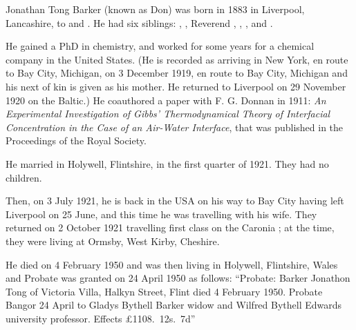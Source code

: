 
Jonathan Tong Barker (known as Don) was born in 1883 \cite{JTBarkerBirth} in Liverpool, Lancashire, to  and .
He had six siblings: , , Reverend ,
, , and .

He gained a PhD in chemistry, and worked for some years for a chemical company in the United States. (He is recorded as arriving in New York, en route to Bay City, Michigan, on 3 December 1919, en route to Bay City, Michigan and his next of kin is given as his mother. He returned to Liverpool on 29 November 1920 on the Baltic.\cite{JTBarkerTravel1})
He coauthored a paper with F. G. Donnan in 1911: \emph{An Experimental Investigation of Gibbs' Thermodynamical Theory of Interfacial Concentration in the Case of an Air-Water Interface}, that was published in the Proceedings of the Royal Society.\cite{RSPA}

He married  in Holywell, Flintshire, in the first quarter of 1921. \cite{JTBarkerMarriage} They had  no children.

Then, on 3 July 1921, he is back in the USA on his way to Bay City having left Liverpool on 25 June, and this time he was travelling with his wife. They returned on 2 October 1921 travelling first class on the Caronia \cite{JTBarkerTravel2};  at the time,  they were living at Ormsby, West Kirby, Cheshire. 

He died on 4 February 1950 and was then living in Holywell, Flintshire, Wales and Probate was granted  on 24 April 1950 as follows:
``Probate: Barker Jonathon Tong of Victoria Villa, Halkyn Street, Flint died 4 February 1950. Probate Bangor 24 April to Gladys Bythell Barker widow and Wilfred Bythell Edwards university professor. Effects \pounds1108.~12s.~7d''
